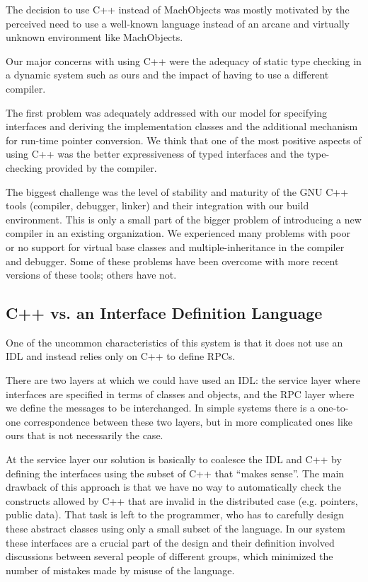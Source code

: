 The decision to use C++ instead of MachObjects was mostly motivated by
the perceived need to use a well-known language instead of an arcane
and virtually unknown environment like MachObjects.

Our major concerns with using C++ were the adequacy of static type
checking in a dynamic system such as ours and the impact of having to use
a different compiler.

The first problem was adequately addressed with our model for specifying
interfaces and deriving the implementation classes and the additional
mechanism for run-time pointer conversion. We think that one of
the most positive aspects of using C++ was the better expressiveness
of typed interfaces and the type-checking provided by the compiler.

The biggest challenge was the level of stability and maturity of the
GNU C++ tools (compiler, debugger, linker) and their integration with
our build environment. This is only a small part of the bigger problem
of introducing a new compiler in an existing organization. We
experienced many 
problems with poor or no support for virtual base classes and
multiple-inheritance in the compiler and debugger. Some of these
problems have been overcome with more recent versions of these tools;
others have not. 

\subsection{C++ vs. an Interface Definition Language}

One of the uncommon characteristics of this system is that it
does not use an IDL and instead relies only on C++ to define RPCs.

There are two layers at which we could have used an IDL: the service
layer where interfaces are specified in terms of classes and objects,
and the RPC layer where we define the messages to be
interchanged. In simple systems there is a one-to-one correspondence
between these two layers, but in more complicated ones like ours that
is not necessarily the case.

At the service layer our solution is basically to coalesce the IDL and
C++ by defining the interfaces using the subset of C++ that ``makes
sense''. The main drawback of this approach is that we have no way to
automatically check the constructs allowed by C++ that are invalid
in the distributed case (e.g. pointers, public data). That task is
left to the programmer, who has to carefully design these abstract
classes using only a small subset of the language. In our system these
interfaces are a crucial part of the design and their definition
involved discussions between several people of different groups, which
minimized the number of mistakes made by misuse of the language.

